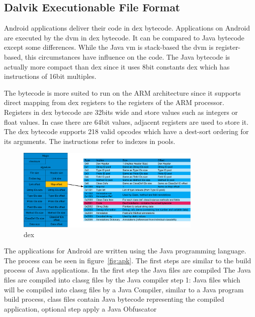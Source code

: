 \subsection{Dalvik Executionable File Format} \label{subsection:android-dalvik}
Android applications deliver their code in \gls{dex} bytecode.
Applications on Android are executed by the \gls{dvm} in \gls{dex} bytecode.
It can be compared to Java bytecode except some differences.
While the Java \gls{vm} is stack-based the \gls{dvm} is register-based, this circumstances have influence on the code.
The Java bytecode is actually more compact than dex since it uses 8bit constants \gls{dex} which has instructions of 16bit multiples.

The bytecode is more suited to run on the ARM architecture since it supports direct mapping from dex registers to the registers of the ARM processor.
Registers in \gls{dex} bytecode are 32bits wide and store values such as integers or float values.
In case there are 64bit values, adjacent registers are used to store it.
The \gls{dex} bytecode supports 218 valid opcodes which have a dest-sort ordering for its arguments.
The instructions refer to indexes in pools.
\begin{figure}[h]
    \centering
    \includegraphics[width=0.8\textwidth]{data/dex.png}
    \caption{dex \cite{andevconDalvikART}}
    \label{fig:dex}
\end{figure}


The applications for Android are written using the Java programming language.
The process can be seen in figure~\ref{fig:apk}.
The first steps are similar to the build process of Java applications.
In the first step the Java files are compiled
The Java files are compiled into \gls{classg} files by the Java compiler
step 1:  Java files which will be compiled into \gls{classg} files by a Java Compiler,  similar to a Java program build process, class files contain Java bytecode representing the compiled application, optional step apply a Java Obfuscator\newline

